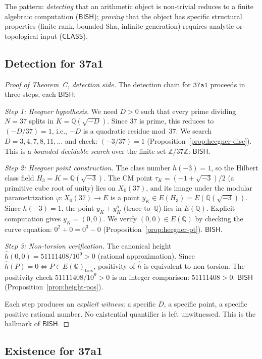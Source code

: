 \documentclass[11pt]{article}
\theoremstyle{plain}
\theoremstyle{definition}
\theoremstyle{remark}
\newcommand{\Z}{\mathbb{Z}}
\newcommand{\Q}{\mathbb{Q}}
\newcommand{\BISH}{\ensuremath{\mathsf{BISH}}}
\newcommand{\CLASS}{\ensuremath{\mathsf{CLASS}}}
\newcommand{\hhat}{\hat{h}}
\begin{document}
The pattern: \emph{detecting} that an arithmetic object is non-trivial reduces to a finite algebraic computation ($\BISH$); \emph{proving} that the object has specific structural properties (finite rank, bounded Sha, infinite generation) requires analytic or topological input ($\CLASS$).

\subsection{Detection for 37a1}

\begin{proof}[Proof of Theorem~C, detection side]
The detection chain for $\texttt{37a1}$ proceeds in three steps, each $\BISH$:

\emph{Step 1: Heegner hypothesis.} We need $D > 0$ such that every prime dividing $N = 37$ splits in $K = \Q(\sqrt{-D})$. Since $37$ is prime, this reduces to $(-D/37) = 1$, i.e., $-D$ is a quadratic residue mod~$37$. We search $D = 3, 4, 7, 8, 11, \ldots$ and check: $(-3/37) = 1$ (Proposition~\ref{prop:heegner-disc}). This is a \emph{bounded decidable search} over the finite set $\Z/37\Z$: $\BISH$.

\emph{Step 2: Heegner point construction.} The class number $h(-3) = 1$, so the Hilbert class field $H_3 = K = \Q(\sqrt{-3})$. The CM point $\tau_K = (-1 + \sqrt{-3})/2$ (a primitive cube root of unity) lies on $X_0(37)$, and its image under the modular parametrization $\varphi: X_0(37) \to E$ is a point $y_K \in E(H_3) = E(\Q(\sqrt{-3}))$. Since $h(-3) = 1$, the point $y_K + y_K^\sigma$ (trace to~$\Q$) lies in $E(\Q)$. Explicit computation \cite{cremona} gives $y_K = (0, 0)$. We verify $(0, 0) \in E(\Q)$ by checking the curve equation: $0^2 + 0 = 0^3 - 0$ (Proposition~\ref{prop:heegner-pt}). $\BISH$.

\emph{Step 3: Non-torsion verification.} The canonical height $\hhat(0, 0) = 51111408/10^9 > 0$ (rational approximation). Since $\hhat(P) = 0 \Leftrightarrow P \in E(\Q)_{\mathrm{tors}}$, positivity of $\hhat$ is equivalent to non-torsion. The positivity check $51111408/10^9 > 0$ is an integer comparison: $51111408 > 0$. $\BISH$ (Proposition~\ref{prop:height-pos}).

Each step produces an \emph{explicit witness}: a specific $D$, a specific point, a specific positive rational number. No existential quantifier is left unwitnessed. This is the hallmark of $\BISH$.
\end{proof}

\subsection{Existence for 37a1}
\end{document}
